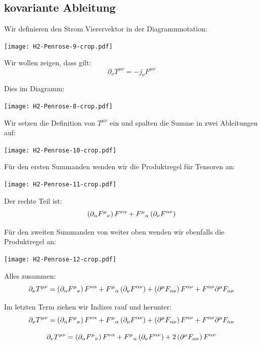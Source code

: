 \subsection{kovariante Ableitung}

Wir definieren den Strom Vierervektor in der Diagrammnotation:
\begin{center}
	\texttt{[image: H2-Penrose-9-crop.pdf]}
\end{center}

Wir wollen zeigen, dass gilt:
\[
	\partial_\nu T^{\mu\nu} = - j_\nu F^{\mu\nu}
\]

Dies im Diagramm:
\begin{center}
	\texttt{[image: H2-Penrose-8-crop.pdf]}
\end{center}

Wir setzen die Definition von $T^{\mu\nu}$ ein und spalten die Summe in zwei
Ableitungen auf:
\begin{center}
	\texttt{[image: H2-Penrose-10-crop.pdf]}
\end{center}

Für den ersten Summanden wenden wir die Produktregel für Tensoren an:
\begin{center}
	\texttt{[image: H2-Penrose-11-crop.pdf]}
\end{center}

Der rechte Teil ist:
\[
	\del{\partial_\alpha F^{\mu}{}_\nu} F^{\nu\alpha}
	+ F^\mu{}_\alpha \del{\partial_\nu F^{\alpha\nu}}
\]

Für den zweiten Summanden von weiter oben wenden wir ebenfalls die Produktregel
an:
\begin{center}
	\texttt{[image: H2-Penrose-12-crop.pdf]}
\end{center}

Alles zusammen:
\[
	\partial_\nu T^{\mu\nu}
	=
	\del{\partial_\alpha F^{\mu}{}_\nu} F^{\nu\alpha}
	+ F^\mu{}_\alpha \del{\partial_\nu F^{\alpha\nu}}
	+ \del{\partial^\mu F_{\alpha\nu}} F^{\alpha\nu}
	+ F^{\alpha\nu} \partial^\mu F_{\alpha\nu}
\]

Im letzten Term ziehen wir Indizes rauf und herunter:
\[
	\partial_\nu T^{\mu\nu}
	=
	\del{\partial_\alpha F^{\mu}{}_\nu} F^{\nu\alpha}
	+ F^\mu{}_\alpha \del{\partial_\nu F^{\alpha\nu}}
	+ \del{\partial^\mu F_{\alpha\nu}} F^{\alpha\nu}
	+ F^{\alpha\nu} \partial^\mu F_{\alpha\nu}
\]

\[
	\partial_\nu T^{\mu\nu}
	=
	\del{\partial_\alpha F^{\mu}{}_\nu} F^{\nu\alpha}
	+ F^\mu{}_\alpha \del{\partial_\nu F^{\alpha\nu}}
	+ 2\del{\partial^\mu F_{\alpha\nu}} F^{\alpha\nu}
\]

